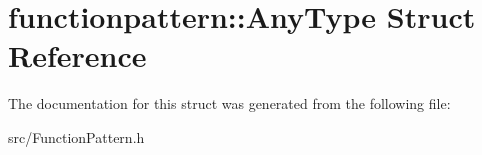 \hypertarget{structfunctionpattern_1_1_any_type}{\section{functionpattern\-:\-:Any\-Type Struct Reference}
\label{structfunctionpattern_1_1_any_type}
}


The documentation for this struct was generated from the following file\-:\begin{DoxyCompactItemize}
\item 
src/Function\-Pattern.\-h\end{DoxyCompactItemize}
